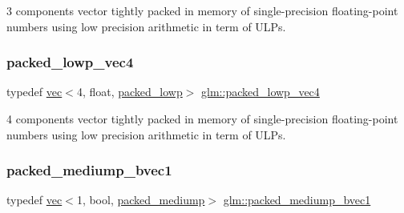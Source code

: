 3 components vector tightly packed in memory of single-\/precision floating-\/point numbers using low precision arithmetic in term of U\+L\+Ps. 

\mbox{\label{group__gtc__type__aligned_ga35756405558e0f3cd7d194f07d557276}} 
\subsubsection{\texorpdfstring{packed\+\_\+lowp\+\_\+vec4}{packed\_lowp\_vec4}}
{\footnotesize\ttfamily typedef \mbox{\hyperlink{structglm_1_1vec}{vec}}$<$4, float, \mbox{\hyperlink{namespaceglm_a36ed105b07c7746804d7fdc7cc90ff25ac36a4bd74559be2c0b65bc48e5953b8b}{packed\+\_\+lowp}}$>$ \mbox{\hyperlink{group__gtc__type__aligned_ga35756405558e0f3cd7d194f07d557276}{glm\+::packed\+\_\+lowp\+\_\+vec4}}}



4 components vector tightly packed in memory of single-\/precision floating-\/point numbers using low precision arithmetic in term of U\+L\+Ps. 

\mbox{\label{group__gtc__type__aligned_ga1dd6d3757af9269de00ba70b0f65a648}} 
\subsubsection{\texorpdfstring{packed\+\_\+mediump\+\_\+bvec1}{packed\_mediump\_bvec1}}
{\footnotesize\ttfamily typedef \mbox{\hyperlink{structglm_1_1vec}{vec}}$<$1, bool, \mbox{\hyperlink{namespaceglm_a36ed105b07c7746804d7fdc7cc90ff25a9604654c3b137cd7898689fd34b25bc0}{packed\+\_\+mediump}}$>$ \mbox{\hyperlink{group__gtc__type__aligned_ga1dd6d3757af9269de00ba70b0f65a648}{glm\+::packed\+\_\+mediump\+\_\+bvec1}}}



